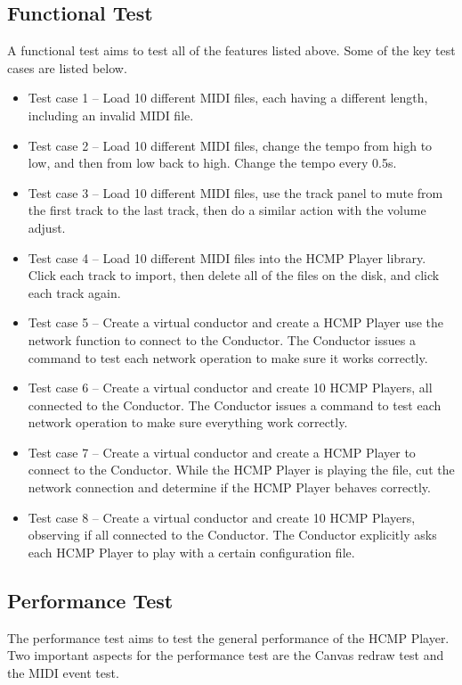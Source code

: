 \subsection{Functional Test}
A functional test aims to test all of the features listed above. Some of the 
key test cases are listed below.
\begin{itemize}
  \item Test case 1 -- Load 10 different MIDI files, each having a different
        length, including an invalid MIDI file.
  \item Test case 2 -- Load 10 different MIDI files, change the tempo from high to 
        low, and then from low back to high. Change the tempo every 0.5s.
  \item Test case 3 -- Load 10 different MIDI files, use the track panel to mute
        from the first track to the last track, then do a similar action with the 
        volume adjust.
  \item Test case 4 -- Load 10 different MIDI files into the HCMP Player library. 
        Click each track to import, then delete all of the files on the disk, and 
        click each track again.
  \item Test case 5 -- Create a virtual conductor and create a HCMP Player use  
        the network function to connect to the Conductor. The Conductor issues a command
        to test each network operation to make sure it works correctly. 
  \item Test case 6 -- Create a virtual conductor and create 10 HCMP Players, 
        all connected to the Conductor. The Conductor issues a command to test 
        each network operation to make sure everything work correctly.
  \item Test case 7 -- Create a virtual conductor and create a HCMP Player 
        to connect to the Conductor. While the HCMP Player is playing the 
        file, cut the
        network connection and determine if the HCMP Player behaves correctly.
  \item Test case 8 -- Create a virtual conductor and create 10 HCMP Players, observing
        if all connected to the Conductor. The Conductor explicitly asks each 
        HCMP Player to play with a certain configuration file.
\end{itemize}

\subsection{Performance Test}
The performance test aims to test the general performance of the HCMP Player. Two 
important aspects for the performance test are the Canvas redraw test and the MIDI
event test. 

